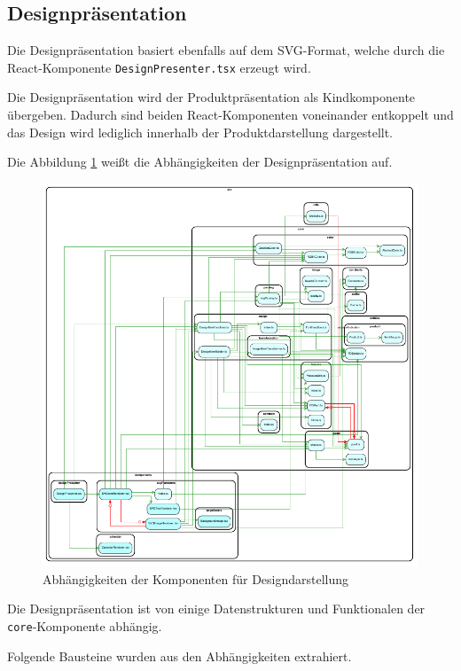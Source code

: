 
\subsection{Designpräsentation}
Die Designpräsentation basiert ebenfalls auf dem SVG-Format, welche durch die React-Komponente \lstinline|DesignPresenter.tsx| erzeugt wird. 

Die Designpräsentation wird der Produktpräsentation als Kindkomponente übergeben. Dadurch sind beiden React-Komponenten voneinander entkoppelt und das Design wird lediglich innerhalb der Produktdarstellung dargestellt.

Die Abbildung \ref{fig:Designdarstellung} weißt die Abhängigkeiten der Designpräsentation auf.

\begin{figure}[H]
    \centering
    \includegraphics{diagrams/Ist-Architektur/design-presenter-analysis.pdf}
    \caption{Abhängigkeiten der Komponenten für Designdarstellung}
    \label{fig:Designdarstellung}
\end{figure}

Die Designpräsentation ist von einige Datenstrukturen und Funktionalen der \lstinline|core|-Komponente abhängig. 

Folgende Bausteine wurden aus den Abhängigkeiten extrahiert.
\begin{multicols}{2}

\end{multicols}